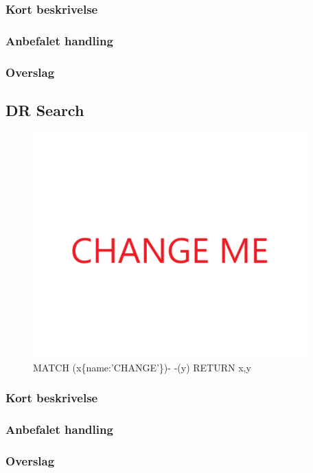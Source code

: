 \documentclass{article}
\begin{document}
\subsubsection{Kort beskrivelse}
\subsubsection{Anbefalet handling}
\subsubsection{Overslag}
\subsection{DR Search}
\begin{figure}[h]
\includegraphics[width=300pt]{CHANGE.PNG}
\caption{MATCH (x\{name:'CHANGE'\})- -(y) RETURN x,y}
\end{figure}
\subsubsection{Kort beskrivelse}
\subsubsection{Anbefalet handling}
\subsubsection{Overslag}
\end{document}
